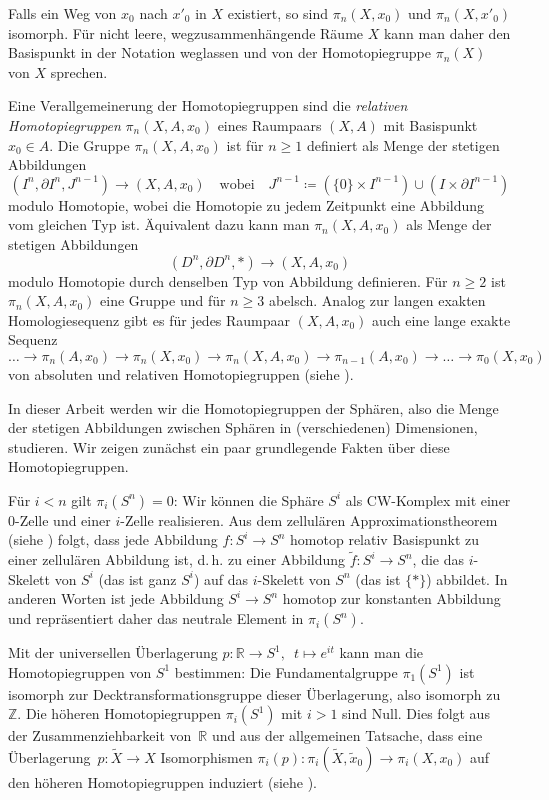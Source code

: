 \documentclass[11pt, a4paper, german]{article}
\theoremstyle{definition}
\theoremstyle{remark}
\newcommand{\R}{\mathbb{R}} %
\newcommand{\Z}{\mathbb{Z}} %
\renewcommand{\dh}{d.\,h.} %
\begin{document}
Falls ein Weg von $x_0$ nach $x'_0$ in $X$ existiert, so sind $\pi_n(X, x_0)$ und $\pi_n(X, x'_0)$ isomorph.
Für nicht leere, wegzusammenhängende Räume $X$ kann man daher den Basispunkt in der Notation weglassen und von der Homotopiegruppe $\pi_n(X)$ von $X$ sprechen.

Eine Verallgemeinerung der Homotopiegruppen sind die \emph{relativen Homotopiegruppen} $\pi_n(X, A, x_0)$ eines Raumpaars $(X, A)$ mit Basispunkt $x_0 \in A$.
Die Gruppe $\pi_n(X, A, x_0)$ ist für $n \geq 1$ definiert als Menge der stetigen Abbildungen
\[
  (I^n, \partial I^n, J^{n-1}) \to (X, A, x_0)
  \quad \text{wobei} \quad
  J^{n-1} \coloneqq (\{ 0 \} \times I^{n-1}) \cup (I \times \partial I^{n-1})
\]
modulo Homotopie, wobei die Homotopie zu jedem Zeitpunkt eine Abbildung vom gleichen Typ ist.
Äquivalent dazu kann man $\pi_n(X, A, x_0)$ als Menge der stetigen Abbildungen
\[
  (D^n, \partial D^n, *) \to (X, A, x_0)
\]
modulo Homotopie durch denselben Typ von Abbildung definieren. %
Für $n \geq 2$ ist $\pi_n(X, A, x_0)$ eine Gruppe und für $n \geq 3$ abelsch.
Analog zur langen exakten Homologiesequenz gibt es für jedes Raumpaar $(X, A, x_0)$ auch eine lange exakte Sequenz
\[
  \ldots
  \to
  \pi_n(A, x_0)
  \to
  \pi_n(X, x_0)
  \to
  \pi_n(X, A, x_0)
  \to
  \pi_{n-1}(A, x_0)
  \to
  \ldots
  \to
  \pi_0(X, x_0)
\]
von absoluten und relativen Homotopiegruppen (siehe \cite[Thm 4.3]{hatcher:at}).

In dieser Arbeit werden wir die Homotopiegruppen der Sphären, also die Menge der stetigen Abbildungen zwischen Sphären in (verschiedenen) Dimensionen, studieren.
Wir zeigen zunächst ein paar grundlegende Fakten über diese Homotopiegruppen.

Für $i < n$ gilt $\pi_i(S^n) = 0$:
Wir können die Sphäre $S^i$  als CW-Komplex mit einer $0$-Zelle und einer $i$-Zelle realisieren.
Aus dem zellulären Approximationstheorem (siehe \cite[Thm 4.8]{hatcher:at}) folgt, dass jede Abbildung $f : S^i \to S^n$ homotop relativ Basispunkt zu einer zellulären Abbildung ist, \dh{} zu einer Abbildung $\tilde{f} : S^i \to S^n$, die das $i$-Skelett von $S^i$ (das ist ganz $S^i$) auf das $i$-Skelett von $S^n$ (das ist $\{ * \}$) abbildet.
In anderen Worten ist jede Abbildung $S^i \to S^n$ homotop zur konstanten Abbildung und repräsentiert daher das neutrale Element in $\pi_i(S^n)$.

Mit der universellen Überlagerung $p : \R \to S^1, \enspace t \mapsto e^{it}$ kann man die Homotopiegruppen von $S^1$ bestimmen:
Die Fundamentalgruppe $\pi_1(S^1)$ ist isomorph zur Decktransformationsgruppe dieser Überlagerung, also isomorph zu~$\Z$.
Die höheren Homotopiegruppen $\pi_i(S^1)$ mit $i > 1$ sind Null.
Dies folgt aus der Zusammenziehbarkeit von~$\R$ und aus der allgemeinen Tatsache, dass eine Überlagerung~$p : \widetilde{X} \to X$ Isomorphismen $\pi_i(p) : \pi_i(\widetilde{X}, \widetilde{x}_0) \to \pi_i(X, x_0)$ auf den höheren Homotopiegruppen induziert (siehe \cite[Prop 4.1]{hatcher:at}).
\end{document}
